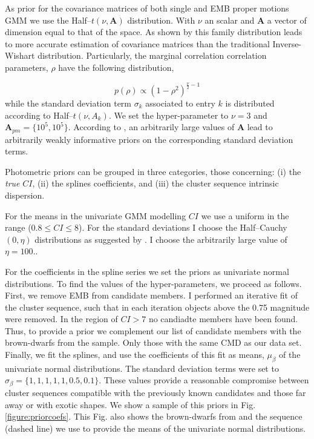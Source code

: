 As prior for the covariance matrices of both single and EMB proper motions GMM we use the Half--$t(\nu,\mathbf{A})$ distribution. With $\nu$ an scalar and $\mathbf{A}$ a vector of dimension equal to that of the space. As shown by \citet{Huang2013} this family distribution leads to more accurate estimation of covariance matrices than the traditional Inverse-Wishart distribution. Particularly, the marginal correlation correlation parameters, $\rho$ have the following distribution,

\begin{equation}
p(\rho) \propto (1-\rho^2)^{\frac{\nu}{2}-1}
\end{equation}
while the standard deviation term $\sigma_k$ associated to entry $k$ is distributed according to Half--$t(\nu,A_k)$. We set the hyper-parameter to $\nu=3$ and $\boldsymbol{A}_{pm}=\{10^5,10^5\}$. According to \citet{Huang2013}, an arbitrarily large values of $\boldsymbol{A}$ lead to arbitrarily weakly informative priors on the corresponding standard deviation terms.

Photometric priors can be grouped in three categories, those concerning: (i) the \emph{true} $CI$, (ii) the splines coefficients, and (iii) the cluster sequence intrinsic dispersion. 

For the means in the univariate GMM modelling $CI$ we use a uniform in the range  ($0.8\leq CI \leq8$). For the standard deviations I choose the Half--Cauchy$(0,\eta)$ distributions as suggested by \citet{Gelman2006}. I choose the arbitrarily large value of $\eta=100$..

For the coefficients in the spline series we set the priors as univariate normal distributions. To find the values of the hyper-parameters, we proceed as follows. First, we remove EMB from \citet{Bouy2015} candidate members. I performed an iterative fit of the cluster sequence, such that in each iteration objects above the 0.75 magnitude were removed. In the region of $CI > 7$ no candiadte members have been found. Thus, to provide a prior we complement our list of candidate members with the brown-dwarfs from the \citet{Faherty2012} sample. Only those with the same CMD as our data set. Finally, we fit the splines, and use the coefficients of this fit as means, $\mu_{\beta}$ of the univariate normal distributions. The standard deviation terms were set to $\sigma_{\beta}=\{1,1,1,1,1,0.5,0.1\}$. These values provide a reasonable compromise between cluster sequences compatible with the previously known candidates and those far away or with exotic shapes. We show a sample of this priors in Fig. \ref{figure:priorcoefs}. This Fig. also shows the brown-dwarfs from \citet{Faherty2012} and the sequence (dashed line) we use to provide the means of the univariate normal distributions.

